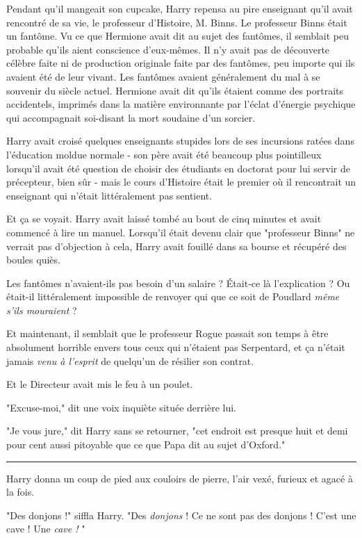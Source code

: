 Pendant qu'il mangeait son cupcake, Harry repensa au pire enseignant qu'il avait rencontré de sa vie, le professeur d'Histoire, M. Binns. Le professeur Binns était un fantôme. Vu ce que Hermione avait dit au sujet des fantômes, il semblait peu probable qu'ils aient conscience d'eux-mêmes. Il n'y avait pas de découverte célèbre faite ni de production originale faite par des fantômes, peu importe qui ils avaient été de leur vivant. Les fantômes avaient généralement du mal à se souvenir du siècle actuel. Hermione avait dit qu'ils étaient comme des portraits accidentels, imprimés dans la matière environnante par l'éclat d'énergie psychique qui accompagnait soi-disant la mort soudaine d'un sorcier.

Harry avait croisé quelques enseignants stupides lors de ses incursions ratées dans l'éducation moldue normale - son père avait été beaucoup plus pointilleux lorsqu'il avait été question de choisir des étudiants en doctorat pour lui servir de précepteur, bien sûr - mais le cours d'Histoire était le premier où il rencontrait un enseignant qui n'était littéralement pas sentient.

Et ça se voyait. Harry avait laissé tombé au bout de cinq minutes et avait commencé à lire un manuel. Lorsqu'il était devenu clair que "professeur Binns" ne verrait pas d'objection à cela, Harry avait fouillé dans sa bourse et récupéré des boules quiès.

Les fantômes n'avaient-ils pas besoin d'un salaire ? Était-ce là l'explication ? Ou était-il littéralement impossible de renvoyer qui que ce soit de Poudlard \emph{même s'ils mouraient}  ?

Et maintenant, il semblait que le professeur Rogue passait son temps à être absolument horrible envers tous ceux qui n'étaient pas Serpentard, et ça n'était jamais \emph{venu à l'esprit}  de quelqu'un de résilier son contrat.

Et le Directeur avait mis le feu à un poulet.

"Excuse-moi," dit une voix inquiète située derrière lui.

"Je vous jure," dit Harry sans se retourner, "cet endroit est presque huit et demi pour cent aussi pitoyable que ce que Papa dit au sujet d'Oxford."
\par\noindent\rule{\textwidth}{0.4pt}
Harry donna un coup de pied aux couloirs de pierre, l'air vexé, furieux et agacé à la fois.

"Des donjons !" siffla Harry. "Des \emph{donjons}  ! Ce ne sont pas des donjons ! C'est une cave ! Une \emph{cave !} "

